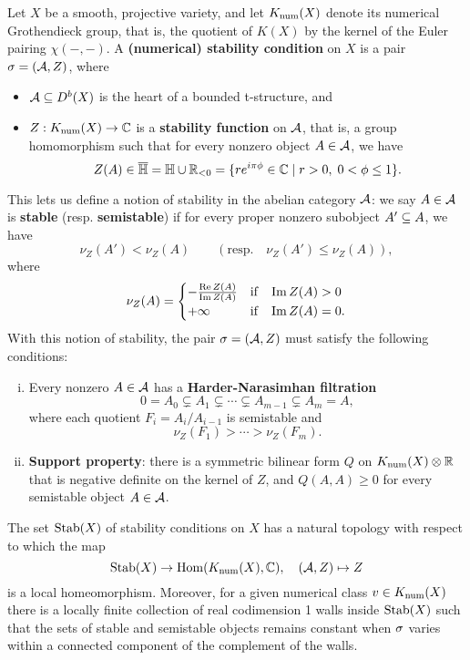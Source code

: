\documentclass[letterpaper,12pt]{amsart}
\theoremstyle{remark}
\begin{document}
Let $X$ be a smooth, projective variety, and let $K_{\mathrm{num}}(X)$ denote its numerical Grothendieck group, that is, the quotient of $K(X)$ by the kernel of the Euler pairing $\chi(-,-)$. A \textbf{(numerical) stability condition} on $X$ is a pair $\sigma = (\mathcal{A}, Z)$, where \begin{itemize}
    \item $\mathcal{A} \subseteq D^b(X)$ is the heart of a bounded t-structure, and
    \item $Z: K_{\mathrm{num}}(X) \to \mathbb{C}$ is a {\bf stability function} on $\mathcal{A}$, that is, a group homomorphism such that for every nonzero object $A \in \mathcal{A}$, we have 
    \[ Z(A) \in \overline{\mathbb{H}} = \mathbb{H} \cup \mathbb{R}_{<0} = \{ r e^{i\pi\phi} \in \mathbb{C} \;|\; r > 0, \; 0 < \phi \le 1 \}. \]
\end{itemize} 
This lets us define a notion of stability in the abelian category $\mathcal{A}$: we say $A \in \mathcal{A}$ is \textbf{stable} (resp. \textbf{semistable}) if for every proper nonzero subobject $A' \subseteq A$, we have
\[ \nu_Z(A') < \nu_Z(A) \qquad (\mathrm{resp.} \quad \nu_Z(A') \leq \nu_Z(A)), \]
where 
\[ \nu_Z(A) = \begin{cases} -\frac{\mathrm{Re}\, Z(A)}{\mathrm{Im}\, Z(A)} & \mathrm{if} \quad \mathrm{Im}\, Z(A) > 0 \\ +\infty & \mathrm{if} \quad \mathrm{Im}\, Z(A) = 0. \end{cases} \]
With this notion of stability, the pair $\sigma = (\mathcal{A}, Z)$ must satisfy the following conditions:
\begin{enumerate}[(i)]
    \item Every nonzero $A \in \mathcal{A}$ has a {\bf Harder-Narasimhan filtration}
    \[ 0 = A_0 \subsetneq A_1 \subsetneq \cdots \subsetneq A_{m-1} \subsetneq A_m = A, \]
    where each quotient $F_i = A_i/A_{i-1}$ is semistable and
    \[ \nu_Z(F_1) > \cdots > \nu_Z(F_m).  \]
    \item {\bf Support property}: there is a symmetric bilinear form $Q$ on $K_{\mathrm{num}}(X) \otimes \mathbb{R}$ that is negative definite on the kernel of $Z$, and $Q(A, A) \ge 0$ for every semistable object $A \in \mathcal{A}$.
\end{enumerate}

The set $\operatorname{\mathrm{Stab}}(X)$ of stability conditions on $X$ has a natural topology with respect to which the map 
\[ \operatorname{\mathrm{Stab}}(X) \to \mathrm{Hom}(K_{\mathrm{num}}(X), \mathbb{C}), \quad (\mathcal{A}, Z) \mapsto Z \]
is a local homeomorphism. Moreover, for a given numerical class $v \in K_{\mathrm{num}}(X)$ there is a locally finite collection of real codimension 1 walls inside $\operatorname{\mathrm{Stab}}(X)$ such that the sets of stable and semistable objects remains constant when $\sigma$ varies within a connected component of the complement of the walls. 
\end{document}
